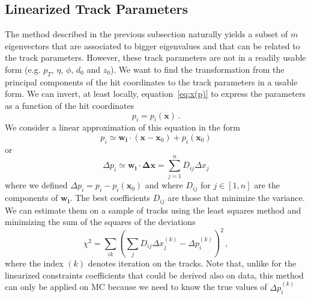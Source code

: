 \documentclass[10pt,a4paper]{report}
\newcommand{\bfx}{\mathbf{x}}
\begin{document}
\subsection{Linearized Track Parameters}

The method described in the previous subsection naturally yields a subset of $m$ eigenvectors that are associated to bigger eigenvalues and that can be related to the track parameters. However, these track parameters are not in a readily usable form (e.g. $p_T$, $\eta$, $\phi$, $d_0$ and $z_0$). We want to find the transformation from the principal components of the hit coordinates to the track parameters in a usable form. We can invert, at least locally, equation~\ref{eq:x(p)} to express the  parameters as a function of the hit coordinates
\begin{equation}
p_i = p_i(\bfx) \, .
\end{equation}
We consider a linear approximation of this equation in the form
\begin{equation}
p_i \simeq \mathbf{w_i}\cdot(\bfx - \bfx_0) + p_i(\bfx_0)
\end{equation}
or
\begin{equation}
\Delta p_i \simeq \mathbf{w_i} \cdot \mathbf{\Delta} \bfx = \sum\limits_{j=1}^n D_{ij} \Delta x_j
\end{equation}
where we defined $\Delta p_i = p_i - p_i(\bfx_0)$ and where $D_{ij}$ for $j\in [1,n]$ are the components of $\mathbf{w_i}$.
The best coefficients $D_{ij}$ are those that minimize the variance. We can estimate them on a sample of tracks using the least squares method and minimizing the sum of the squares of the deviations
\begin{equation}
\chi^2 = \sum\limits_{ik}\left(\sum\limits_j D_{ij} \Delta x_j^{(k)} - \Delta p_i^{(k)} \right)^2 \, ,
\label{eq:chi2}
\end{equation}
where the index $(k)$ denotes iteration on the tracks. Note that, unlike for the linearized constraints coefficients that could be derived also on data, this method can only be applied on MC because we need to know the true values of $\Delta p_i^{(k)}$
\end{document}
